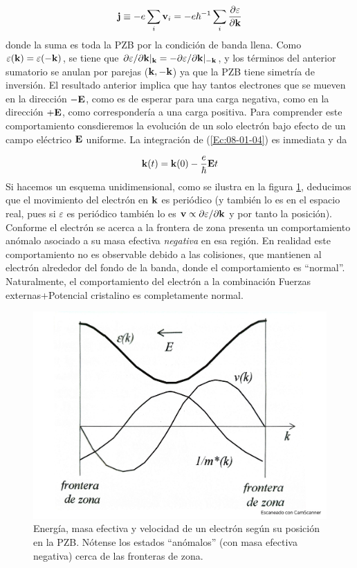 \begin{equation*}
	\mathbf{j} \equiv - e \sum_i \mathbf{v}_i= -e \hbar^{-1} \sum_i \frac{\partial \varepsilon}{\partial \mathbf{k}}
\end{equation*}
donde la suma es toda la PZB por la condición de banda llena. Como $\varepsilon(\mathbf{k})=\varepsilon(-\mathbf{k})$, se tiene que $\partial \varepsilon / \partial \mathbf{k} |_{\mathbf{k}} = - \partial \varepsilon / \partial \mathbf{k} |_{-\mathbf{k}}$, y los términos del anterior sumatorio se anulan por parejas ($\mathbf{k},-\mathbf{k}$) ya que la PZB tiene simetría de inversión. El resultado anterior implica que hay tantos electrones que se mueven en la dirección $-\mathbf{E}$, como es de esperar para una carga negativa, como en la dirección $+\mathbf{E}$, como correspondería a una carga positiva. Para comprender este comportamiento consdieremos la evolución de un solo electrón bajo efecto de un campo eléctrico $\mathbf{E}$ uniforme. La integración de (\ref{Ec:08-01-04}) es inmediata y da 

\begin{equation}
	\mathbf{k} (t) = \mathbf{k}(0) - \frac{e}{\hbar} \mathbf{E} t
\end{equation}
Si hacemos un esquema unidimensional, como se ilustra en la figura \ref{Fig:08-02}, deducimos que el movimiento del electrón en $\mathbf{k}$ es periódico (y también lo es en el espacio real, pues si $\varepsilon$ es periódico también lo es $\mathbf{v} \propto \partial \varepsilon / \partial \mathbf{k}$ y por tanto la posición). Conforme el electrón se acerca a la frontera de zona presenta un comportamiento anómalo asociado a su masa efectiva \textit{negativa} en esa región. En realidad este comportamiento no es observable debido a las colisiones,  que mantienen al electrón alrededor del fondo de la banda, donde el comportamiento es ``normal''. Naturalmente, el comportamiento del electrón a la combinación Fuerzas externas+Potencial cristalino es completamente normal.

\begin{figure}[h!] \centering
	\includegraphics[scale=0.35]{Cuerpo/Ch_08/Fotos libro 2.pdf}
	\caption{Energía, masa efectiva y velocidad de un electrón según su posición en la PZB. Nótense los estados ``anómalos'' (con masa efectiva negativa) cerca de las fronteras de zona.}
	\label{Fig:08-02}
\end{figure}

